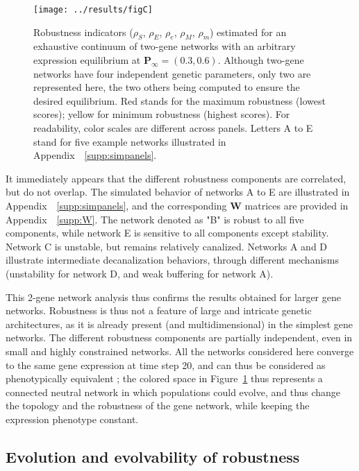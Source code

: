 \documentclass[10pt,a4paper]{article}
\newcommand{\stability}{{\rho_S}}
\newcommand{\earlyenv}{{\rho_E}}
\newcommand{\lateenv}{{\rho_e}}
\newcommand{\earlymut}{{\rho_M}}
\newcommand{\latemut}{{\rho_m}}
\newcommand{\SupMat}{Appendix~}
\begin{document}
\begin{figure}[t]
\begin{adjustwidth}{-1in}{0in}
\begin{flushright}
\texttt{[image: ../results/figC]}
\caption{\color{Gray} \label{fig:imgpanels} Robustness indicators ($\stability$, $\earlyenv$, $\lateenv$, $\earlymut$, $\latemut$) estimated for an exhaustive continuum of two-gene networks with an arbitrary expression equilibrium at $\bm P_\infty = (0.3, 0.6)$. Although two-gene networks have four independent genetic parameters, only two are represented here, the two others being computed to ensure the desired equilibrium. Red stands for the maximum robustness (lowest scores); yellow for minimum robustness (highest scores). For readability, color scales are different across panels. Letters A to E stand for five example networks illustrated in \SupMat~\ref{supp:simpanels}.}
\end{flushright}\end{adjustwidth}
\end{figure}

It immediately appears that the different robustness components are correlated, but do not overlap. The simulated behavior of networks A to E are illustrated in \SupMat~\ref{supp:simpanels}, and the corresponding $\bm W$ matrices are provided in \SupMat~\ref{supp:W}. The network denoted as "B" is robust to all five components, while network E is sensitive to all components except stability. Network C is unstable, but remains relatively canalized. Networks A and D illustrate intermediate decanalization behaviors, through different mechanisms (unstability for network D, and weak buffering for network A). 

This 2-gene network analysis thus confirms the results obtained for larger gene networks. Robustness is thus not a feature of large and intricate genetic architectures, as it is already present (and multidimensional) in the simplest gene networks. The different robustness components are partially independent, even in small and highly constrained networks. All the networks considered here converge to the same gene expression at time step 20, and can thus be considered as phenotypically equivalent ; the colored space in Figure~\ref{fig:imgpanels} thus represents a connected neutral network in which populations could evolve, and thus change the topology and the robustness of the gene network, while keeping the expression phenotype constant. 

\subsection{Evolution and evolvability of robustness}
\end{document}
